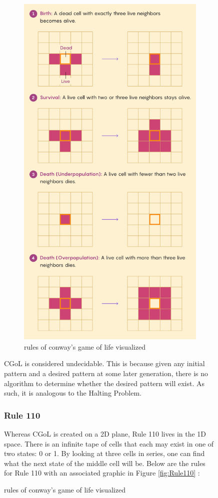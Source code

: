 \begin{figure}[htb]
\begin{figure}[h!]
    \centering
    \includegraphics[width=10cm]{images/cgol.png}
       \caption{rules of conway's game of life visualized}
           \label{fig:cgolrules}
\end{figure}

CGoL is considered undecidable.
This is because given any initial pattern and a desired pattern at some later generation, there is no algorithm to determine whether the desired pattern will exist.
As such, it is analogous to the Halting Problem.

\subsubsection{Rule 110}\label{subsubsec:Rule110}

Whereas CGoL is created on a 2D plane, Rule 110 lives in the 1D space.
There is an infinite tape of cells that each may exist in one of two states: 0 or 1.
By looking at three cells in series, one can find what the next state of the middle cell will be.
Below are the rules for Rule 110 with an associated graphic in Figure \ref{fig:Rule110} \cite{Rule110Img}:


\end{figure}
